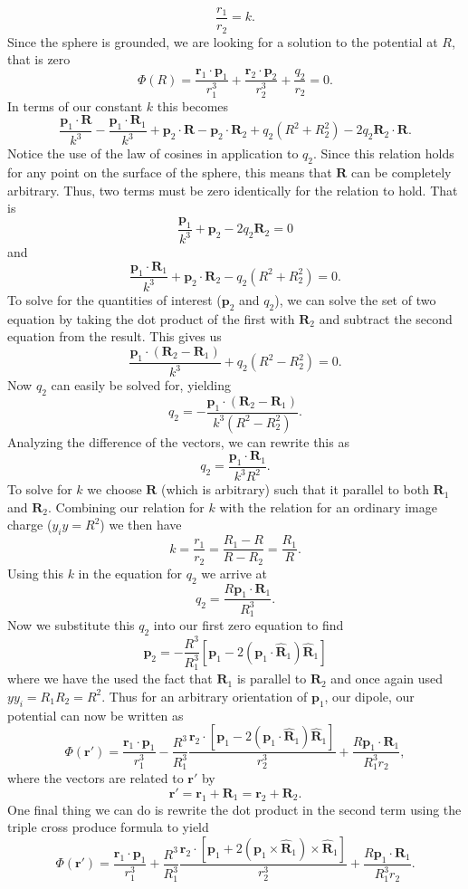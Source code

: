 \documentclass[11pt,letterpaper]{article}
\newcommand{\vect}[1]{\mathbf{#1}}
\newcommand{\vecth}[1]{\hat{\mathbf{#1}}}
\begin{document}
\begin{enumerate}
$$\frac{r_1}{r_2} = k.$$
Since the sphere is grounded, we are looking for a solution to the potential at $R$, that is zero
$$\Phi(R) = \frac{\vect r_1\cdot\vect p_1}{r_1^3}+\frac{\vect r_2\cdot\vect p_2}{r_2^3}+\frac{q_2}{r_2}=0.$$
In terms of our constant $k$ this becomes
$$\frac{\vect p_1\cdot\vect R}{k^3}-\frac{\vect p_1\cdot\vect R_1}{k^3}+\vect p_2\cdot\vect R-\vect p_2\cdot\vect R_2+q_2(R^2+R_2^2)-2q_2\vect R_2\cdot\vect R. $$
Notice the use of the law of cosines in application to $q_2$. Since this relation holds for any point on the surface of the sphere, this means that $\vect R$ can be completely arbitrary. Thus, two terms must be zero identically for the relation to hold. That is
$$\frac{\vect p_1}{k^3}+\vect p_2-2q_2\vect R_2 = 0$$
and
$$\frac{\vect p_1\cdot \vect R_1}{k^3}+\vect p_2\cdot\vect R_2 - q_2(R^2+R_2^2) = 0.$$
To solve for the quantities of interest ($\vect p_2$ and $q_2$), we can solve the set of two equation by taking the dot product of the first with $\vect R_2$ and subtract the second equation from the result. This gives us
$$\frac{\vect p_1\cdot\left(\vect R_2-\vect R_1\right)}{k^3}+q_2(R^2-R_2^2) = 0.$$
Now $q_2$ can easily be solved for, yielding
$$q_2 = -\frac{\vect p_1\cdot(\vect R_2-\vect R_1)}{k^3(R^2-R_2^2)}.$$
Analyzing the difference of the vectors, we can rewrite this as
$$q_2 = \frac{\vect p_1\cdot\vect R_1}{k^3R^2}.$$
To solve for $k$ we choose $\vect R$ (which is arbitrary) such that it parallel to both $\vect R_1$ and $\vect R_2$. Combining our relation for $k$ with the relation for an ordinary image charge ($y_iy=R^2$) we then have
$$k = \frac{r_1}{r_2} = \frac{R_1-R}{R-R_2} = \frac{R_1}{R}.$$
Using this $k$ in the equation for $q_2$ we arrive at
$$q_2 = \frac{R\vect p_1\cdot\vect R_1}{R_1^3}.$$
Now we substitute this $q_2$ into our first zero equation to find
$$\vect p_2 = -\frac{R^3}{R_1^3}\left[\vect p_1-2\left(\vect p_1\cdot\vecth R_1\right)\vecth R_1\right]$$
where we have the used the fact that $\vect R_1$ is parallel to $\vect R_2$ and once again used $yy_i=R_1R_2=R^2$. Thus for an arbitrary orientation of $\vect p_1$, our dipole, our potential can now be written as 
$$\Phi(\vect r') = \frac{\vect r_1\cdot\vect p_1}{r_1^3}-\frac{R^3}{R_1^3}\frac{\vect r_2\cdot\left[\vect p_1-2\left(\vect p_1\cdot\vecth R_1\right)\vecth R_1\right]}{r_2^3}+ \frac{R\vect p_1\cdot\vect R_1}{R_1^3r_2},$$
where the vectors are related to $\vect r'$ by
$$\vect r' = \vect r_1+\vect R_1=\vect r_2+\vect R_2.$$
One final thing we can do is rewrite the dot product in the second term using the triple cross produce formula to yield
$$\Phi(\vect r') = \frac{\vect r_1\cdot\vect p_1}{r_1^3}+\frac{R^3}{R_1^3}\frac{\vect r_2\cdot\left[\vect p_1+2\left(\vect p_1\times\vecth R_1\right)\times\vecth R_1\right]}{r_2^3}+ \frac{R\vect p_1\cdot\vect R_1}{R_1^3r_2}.$$

\end{enumerate}
\end{document}
